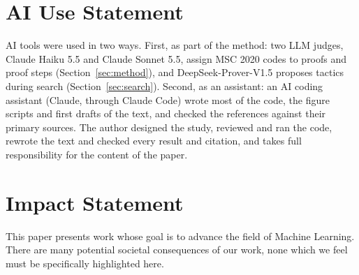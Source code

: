 
\section*{AI Use Statement}
AI tools were used in two ways. First, as part of the method: two LLM judges,
Claude Haiku 5.5 and Claude Sonnet 5.5, assign MSC 2020 codes to proofs and
proof steps (Section~\ref{sec:method}), and DeepSeek-Prover-V1.5 proposes
tactics during search (Section~\ref{sec:search}). Second, as an assistant: an
AI coding assistant (Claude, through Claude Code) wrote most of the code,
the figure scripts and first drafts of the text, and checked the references
against their primary sources. The author designed the study, reviewed and
ran the code, rewrote the text and checked every result and citation, and
takes full responsibility for the content of the paper.

\section*{Impact Statement}
This paper presents work whose goal is to advance the field of Machine
Learning. There are many potential societal consequences of our work, none
which we feel must be specifically highlighted here.

